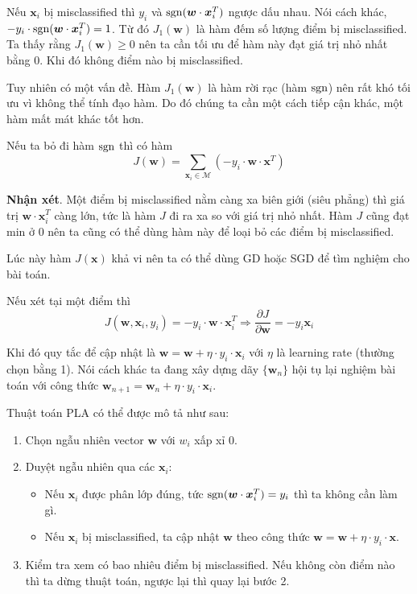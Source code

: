 Nếu $\bm{x}_i$ bị misclassified thì $y_i$ và $\operatorname{sgn} (\bm{w} \cdot \bm{x}_i^T)$ ngược dấu nhau. Nói cách khác, $-y_i \cdot \operatorname{sgn} (\bm{w} \cdot \bm{x}_i^T) = 1$. Từ đó $J_1(\bm{w})$ là hàm đếm số lượng điểm bị misclassified. Ta thấy rằng $J_1(\bm{w}) \geq 0$ nên ta cần tối ưu để hàm này đạt giá trị nhỏ nhất bằng 0. Khi đó không điểm nào bị misclassified.

Tuy nhiên có một vấn đề. Hàm $J_1(\bm{w})$ là hàm rời rạc (hàm $\operatorname{sgn}$) nên rất khó tối ưu vì không thể tính đạo hàm. Do đó chúng ta cần một cách tiếp cận khác, một hàm mất mát khác tốt hơn.

Nếu ta bỏ đi hàm $\operatorname{sgn}$ thì có hàm \[ J(\bm{w}) = \sum_{\bm{x}_i \in \mathcal{M}} (-y_i \cdot \bm{w} \cdot \bm{x}^T) \]

\textbf{Nhận xét}. Một điểm bị misclassified nằm càng xa biên giới (siêu phẳng) thì giá trị $\bm{w} \cdot \bm{x}_i^T$ càng lớn, tức là hàm $J$ đi ra xa so với giá trị nhỏ nhất. Hàm $J$ cũng đạt min ở 0 nên ta cũng có thể dùng hàm này để loại bỏ các điểm bị misclassified.

Lúc này hàm $J(\bm{x})$ khả vi nên ta có thể dùng GD hoặc SGD để tìm nghiệm cho bài toán.

Nếu xét tại một điểm thì \[ J(\bm{w}, \bm{x}_i, y_i) = -y_i \cdot \bm{w} \cdot \bm{x}_i^T \Rightarrow \dfrac{\partial J}{\partial \bm{w}} = -y_i \bm{x}_i \]

Khi đó quy tắc để cập nhật là $\bm{w} = \bm{w} + \eta \cdot y_i \cdot \bm{x}_i$ với $\eta$ là learning rate (thường chọn bằng 1). Nói cách khác ta đang xây dựng dãy $\{ \bm{w}_n \}$ hội tụ lại nghiệm bài toán với công thức $\bm{w}_{n+1} = \bm{w}_n + \eta \cdot y_i \cdot \bm{x}_i$.

Thuật toán PLA có thể được mô tả như sau:

\begin{enumerate}
    \item Chọn ngẫu nhiên vector $\bm{w}$ với $w_i$ xấp xỉ 0.
    \item Duyệt ngẫu nhiên qua các $\bm{x}_i$:
    \begin{itemize}
        \item Nếu $\bm{x}_i$ được phân lớp đúng, tức $\operatorname{sgn}(\bm{w} \cdot \bm{x}_i^T) = y_i$ thì ta không cần làm gì.
        \item Nếu $\bm{x}_i$ bị misclassified, ta cập nhật $\bm{w}$ theo công thức $\bm{w} = \bm{w} + \eta \cdot y_i \cdot \bm{x}$.
    \end{itemize}
    \item Kiểm tra xem có bao nhiêu điểm bị misclassified. Nếu không còn điểm nào thì ta dừng thuật toán, ngược lại thì quay lại bước 2.
\end{enumerate}
